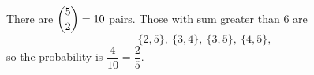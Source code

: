 There are $\dbinom52=10$ pairs. Those with sum greater than $6$ are
\[\{2,5\},\ \{3,4\},\ \{3,5\},\ \{4,5\},\]
so the probability is $\dfrac{4}{10}=\boxed{\dfrac25}$.
